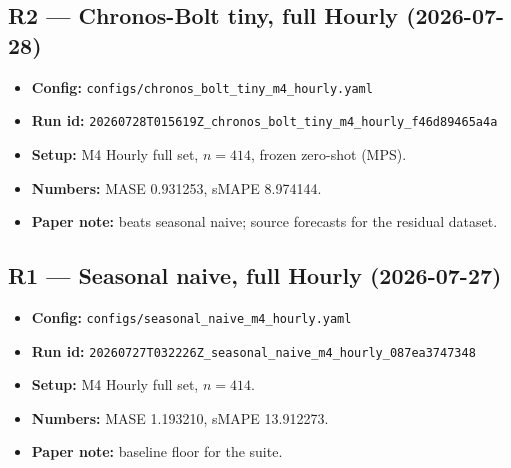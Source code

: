 \subsection*{R2 --- Chronos-Bolt tiny, full Hourly (2026-07-28)}
\begin{itemize}
  \item \textbf{Config:} \texttt{configs/chronos\_bolt\_tiny\_m4\_hourly.yaml}
  \item \textbf{Run id:}
        \texttt{20260728T015619Z\_chronos\_bolt\_tiny\_m4\_hourly\_f46d89465a4a}
  \item \textbf{Setup:} M4 Hourly full set, $n=414$, frozen zero-shot (MPS).
  \item \textbf{Numbers:} MASE 0.931253, sMAPE 8.974144.
  \item \textbf{Paper note:} beats seasonal naive; source forecasts for the
        residual dataset.
\end{itemize}

\subsection*{R1 --- Seasonal naive, full Hourly (2026-07-27)}
\begin{itemize}
  \item \textbf{Config:} \texttt{configs/seasonal\_naive\_m4\_hourly.yaml}
  \item \textbf{Run id:}
        \texttt{20260727T032226Z\_seasonal\_naive\_m4\_hourly\_087ea3747348}
  \item \textbf{Setup:} M4 Hourly full set, $n=414$.
  \item \textbf{Numbers:} MASE 1.193210, sMAPE 13.912273.
  \item \textbf{Paper note:} baseline floor for the suite.
\end{itemize}
